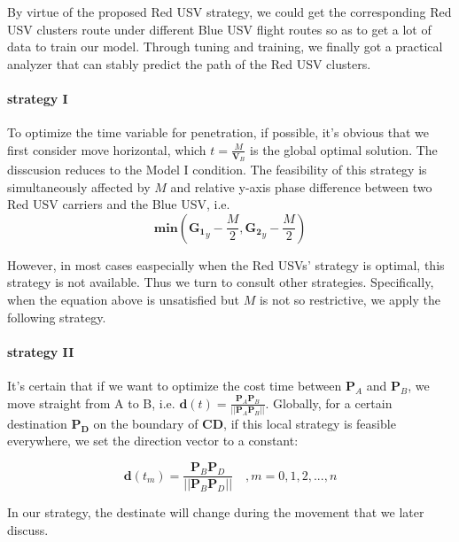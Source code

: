 \documentclass{mcmthesis}
\begin{document}
By virtue of the proposed Red USV strategy, we could get the corresponding Red USV clusters route under different Blue USV flight routes so as to get a lot of data to train our model. Through tuning and training, we finally got a practical analyzer that can stably predict the path of the Red USV clusters. \par

\paragraph{strategy I}

To optimize the time variable for penetration, if possible, it's obvious that we first consider move horizontal, which $t=\frac{M}{\mathbf{V}_{B}}$ is the global optimal solution. The disscusion reduces to the Model I condition. The feasibility of this strategy is simultaneously affected by $M$ and relative y-axis phase difference between two Red USV carriers and the Blue USV, i.e. 
\begin{equation}
\mathbf{min}(\mathbf{G_1}_y - \frac{M}{2}, \mathbf{G_2}_y - \frac{M}{2})
\end{equation}

However, in most cases easpecially when the Red USVs' strategy is optimal, this strategy is not available. Thus we turn to consult other strategies. Specifically, when the equation above is unsatisfied but $M$ is not so restrictive, we apply the following strategy.

\paragraph{strategy II}

It's certain that if we want to optimize the cost time between $\mathbf{P}_A$ and $\mathbf{P}_B$, we move straight from A to B, i.e. $\mathbf{d}(t)=\frac{\mathbf{P}_A \mathbf{P}_B}{\vert \vert \mathbf{P}_A \mathbf{P}_B \vert \vert}$. Globally, for a certain destination $\mathbf{P_D}$ on the boundary of $\mathbf{CD}$, if this local strategy is feasible everywhere, we set the direction vector to a constant:

\begin{equation}
\mathbf{d}(t_m)=\frac{\mathbf{P}_B \mathbf{P}_D}{\vert \vert \mathbf{P}_B \mathbf{P}_D \vert \vert} \quad ,m = 0, 1, 2, ..., n
\end{equation}

In our strategy, the destinate will change during the movement that we later discuss. \par
\end{document}
